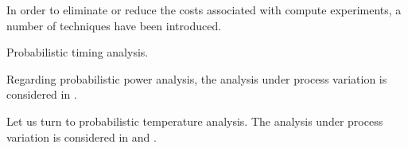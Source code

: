 In order to eliminate or reduce the costs associated with compute experiments, a
number of techniques have been introduced.

Probabilistic timing analysis.

Regarding probabilistic power analysis, the analysis under process variation is
considered in \cite{ukhov2014}.

Let us turn to probabilistic temperature analysis. The analysis under process
variation is considered in \cite{ukhov2014} and \cite{ukhov2015}.
